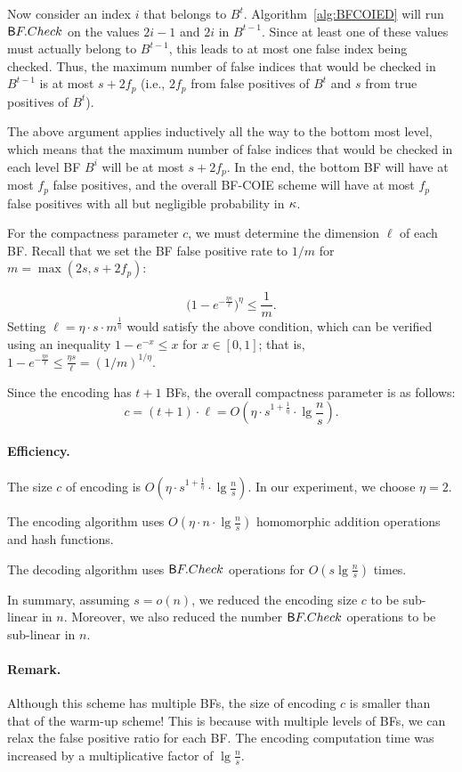 Now consider an index $i$ that belongs to $B^{t}$.  Algorithm~\ref{alg:BFCOIED} will 
run ${\sf BF.Check}$ on the values $2i-1$ and $2i$ in $B^{t-1}$.  Since at least one
of these values must actually belong to $B^{t-1}$, this leads to at most one false index
being checked.
%
Thus, the maximum number of false indices that would be checked in
$B^{t-1}$ is at most $s + 2f_p$ (i.e., $2f_p$ from false
positives of $B^t$ and $s$ from true positives of $B^t$). 

The above argument applies inductively all the way to the bottom most
level, which means that the maximum number of false indices that would
be checked in each level BF $B^i$ will be at most $s + 2f_p$.  In the
end, the bottom BF will have at most $f_p$ false positives, and the
overall BF-COIE scheme will have at most $f_p$ false positives with all
but negligible probability in $\secparam$. 
 
For the compactness parameter $c$, we must determine the dimension $\ell$
of each BF. Recall that we set the BF false positive rate to 
$1/m$ for $m = \max(2s, s+2f_p)$:

$$ \Big(1 - e^{-\frac{\eta s}{\ell}} \Big)^\eta \le \frac 1 m.$$ 
Setting 
$\ell = \eta \cdot s \cdot m^{\frac 1 \eta}$ would
satisfy the above condition, which can be  
verified using an inequality $1 - e^{-x} \le x$ for $x \in [0,1]$; that
is, $1 - e^{-\frac{\eta s}{\ell}} \le \frac{\eta s}{\ell} =
(1/m)^{1/\eta}.$

Since the encoding has $t+1$ BFs, the overall compactness parameter is as
follows:
$$c = (t + 1) \cdot \ell = O\left ( \eta \cdot s^{1 + \frac 1 \eta}
\cdot \lg \frac n s \right ).$$

\paragraph{Efficiency.}
\BI
\item The size $c$ of encoding is $O\left ( \eta \cdot s^{1 + \frac 1 \eta} \cdot
\lg \frac n s \right )$. In our experiment, we choose $\eta = 2$. 

\item The encoding algorithm uses $O(\eta
\cdot n \cdot \lg \frac n s)$ homomorphic addition operations and hash
functions. 

\item The decoding algorithm uses $\sf BF.Check$ operations for $O(s \lg
\frac n s)$ times. 
\EI

In summary, assuming $s = o(n)$, we reduced the encoding size $c$ to be
sub-linear in $n$.  Moreover, we also reduced the number $\sf BF.Check$
operations to be sub-linear in $n$. 

\paragraph{Remark.} Although this scheme has multiple BFs, the size of
encoding $c$ is smaller than that of the warm-up scheme! This is because
with multiple levels of BFs, we can relax the false positive ratio for
each BF. The encoding computation time was increased by a multiplicative
factor of $\lg \frac n s$. 

